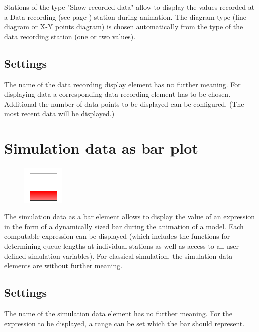 Stations of the type "Show recorded data" allow to display the values
recorded at a Data recording (see page \pageref{ref:ModelElementRecord}) station
during animation. The diagram type (line diagram or X-Y points diagram) is
chosen automatically from the type of the data recording station (one or two values).

\subsection*{Settings}

The name of the data recording display element has no further meaning. For
displaying data a corresponding data recording element has to be chosen.
Additional the number of data points to be displayed can be configured.
(The most recent data will be displayed.)


\section{Simulation data as bar plot}
\label{ref:ModelElementAnimationBar}

\begin{figure}
\vspace{-22pt}
\includegraphics[width=2cm]{imageModelElementAnimationBar.png}
\vspace{-22pt}
\end{figure}

The simulation data as a bar element allows to display the value of an expression in the form of a dynamically sized
bar during the animation of a model. Each computable expression can be displayed (which includes the functions for
determining queue lengths at individual stations as well as access to all user-defined simulation variables).
For classical simulation, the simulation data elements are without further meaning.

\subsection*{Settings}

The name of the simulation data element has no further meaning.
For the expression to be displayed, a range can be set which the bar should represent.


